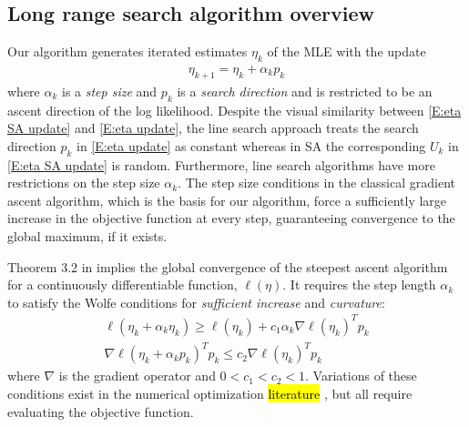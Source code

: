 

\subsection{Long range search algorithm overview}  \label{S:algorithm overview}

Our algorithm generates iterated estimates $\eta_k$ of the MLE with the 
update 
\begin{align} \label{E:eta update}
	\eta_{k+1} = \eta_k + \alpha_k p_k
\end{align}
where $\alpha_k$ is a \emph{step size} and $p_k$ is a \emph{search direction} and is 
restricted to be an ascent direction of 
the log likelihood.  
Despite the visual similarity between \eqref{E:eta SA update} and \eqref{E:eta 
update}, the line search approach treats 
the search direction $p_k$ in \eqref{E:eta update} as constant whereas in SA the 
corresponding $U_k$ in \eqref{E:eta SA update} is random.
Furthermore, line search algorithms have more restrictions on the step size $\alpha_k$.  
The step size 
conditions in the classical gradient ascent algorithm, which is the basis for our 
algorithm, force  a sufficiently 
large increase in the objective function at every step, guaranteeing convergence to 
the global maximum, if it exists.

Theorem 3.2 in \citet{NW} implies the global convergence of the steepest ascent 
algorithm for a continuously differentiable function, $\ell(\eta)$.  It requires the 
step length $\alpha_k$ to satisfy 
the Wolfe conditions for \emph{sufficient increase} and \emph{curvature}:
\begin{equation} \label{eq:wolfe}
\begin{split}
	\ell(\eta_k + \alpha_k \eta_k) \geq \ell(\eta_k) + c_1 \alpha_k \nabla \ell (\eta_k)^T p_k \\
	\nabla \ell( \eta_k + \alpha_k p_k)^T p_k \leq c_2 \nabla \ell( \eta_k)^T p_k
\end{split}
\end{equation}
where $\nabla$ is the gradient operator and $0 < c_1 < c_2 < 1$.   
Variations of these conditions exist in the numerical optimization \hl{literature} \citep
{Fletcher,NW,Sun:2006}, but all 
require evaluating the objective function.


